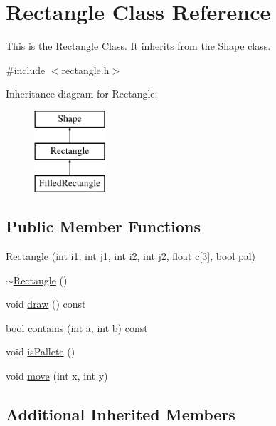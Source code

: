 \hypertarget{classRectangle}{\section{Rectangle Class Reference}
\label{classRectangle}
}


This is the \hyperlink{classRectangle}{Rectangle} Class. It inherits from the \hyperlink{classShape}{Shape} class.  




{\ttfamily \#include $<$rectangle.\-h$>$}

Inheritance diagram for Rectangle\-:\begin{figure}[H]
\begin{center}
\leavevmode
\includegraphics[height=3.000000cm]{classRectangle}
\end{center}
\end{figure}
\subsection*{Public Member Functions}
\begin{DoxyCompactItemize}
\item 
\hyperlink{classRectangle_adf0964454431d23ef36abea2496d587e}{Rectangle} (int i1, int j1, int i2, int j2, float c\mbox{[}3\mbox{]}, bool pal)
\item 
\hyperlink{classRectangle_a494c076b13aadf26efdce07d23c61ddd}{$\sim$\-Rectangle} ()
\item 
void \hyperlink{classRectangle_af3b5f195986cdf6c5b5df95fa9ab22b8}{draw} () const 
\item 
bool \hyperlink{classRectangle_a763094105c015cce727a486baff1dfaf}{contains} (int a, int b) const 
\item 
void \hyperlink{classRectangle_a5723f7551b73038c4aadf2fa833f7fcd}{is\-Pallete} ()
\item 
void \hyperlink{classRectangle_a3cfcca33879bd4cd31ed738578eca79e}{move} (int x, int y)
\end{DoxyCompactItemize}
\subsection*{Additional Inherited Members}


